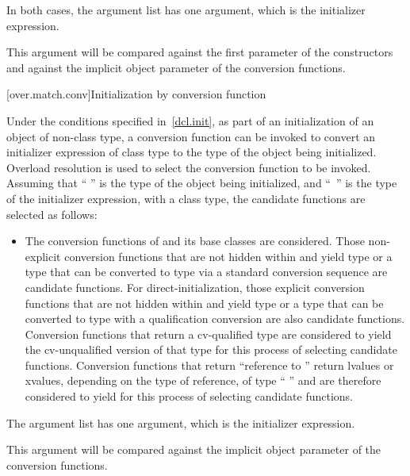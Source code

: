 \pnum
In both cases, the argument list has one argument, which is the initializer
expression.
\begin{note}
This argument will be compared against
the first parameter of the constructors and against the implicit
object parameter of the conversion functions.
\end{note}

[over.match.conv]{Initialization by conversion function}%

\pnum
Under the conditions specified in~\ref{dcl.init}, as
part of an initialization of an object of non-class type,
a conversion function can be invoked to convert an initializer
expression of class type to the type of the object
being initialized.
Overload resolution is used to select the
conversion function to be invoked.
Assuming that `` '' is the
type of the object being initialized, and ``\cv{}~'' is the type
of the initializer expression, with
a class type,
the candidate functions are selected as follows:

\begin{itemize}
\item
The conversion functions of
and its base classes are considered.
Those non-explicit conversion functions that are not hidden
within
and yield type
or a type that can be converted to type
via a standard conversion sequence
are candidate functions.
For direct-initialization, those explicit conversion functions that are not
hidden within  and yield type  or a type that can be converted
to type  with a qualification conversion are also
candidate functions.
Conversion functions that return a cv-qualified type
are considered to yield the cv-unqualified version of that type
for this process of selecting candidate functions.
Conversion functions that return ``reference to
''
return
lvalues or xvalues, depending on the type of reference, of type
``
''
and are therefore considered to yield
for this
process of selecting candidate functions.
\end{itemize}

\pnum
The argument list has one argument, which is the initializer expression.
\begin{note}
This argument will be compared against
the implicit object parameter of the conversion functions.
\end{note}

